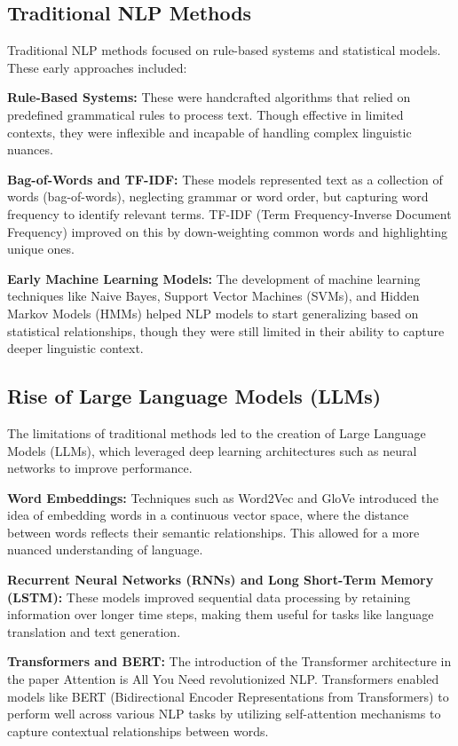 \subsection{Traditional NLP Methods}
Traditional NLP methods focused on rule-based systems and statistical models. These early approaches included:

\textbf{Rule-Based Systems:} These were handcrafted algorithms that relied on predefined grammatical rules to process text. Though effective in limited contexts, they were inflexible and incapable of handling complex linguistic nuances.

\textbf{Bag-of-Words and TF-IDF:} These models represented text as a collection of words (bag-of-words), neglecting grammar or word order, but capturing word frequency to identify relevant terms. TF-IDF (Term Frequency-Inverse Document Frequency) improved on this by down-weighting common words and highlighting unique ones.

\textbf{Early Machine Learning Models:} The development of machine learning techniques like Naive Bayes, Support Vector Machines (SVMs), and Hidden Markov Models (HMMs) helped NLP models to start generalizing based on statistical relationships, though they were still limited in their ability to capture deeper linguistic context.

\subsection{Rise of Large Language Models (LLMs)}
The limitations of traditional methods led to the creation of Large Language Models (LLMs), which leveraged deep learning architectures such as neural networks to improve performance.

\textbf{Word Embeddings:} Techniques such as Word2Vec and GloVe introduced the idea of embedding words in a continuous vector space, where the distance between words reflects their semantic relationships. This allowed for a more nuanced understanding of language.

\textbf{Recurrent Neural Networks (RNNs) and Long Short-Term Memory (LSTM):} These models improved sequential data processing by retaining information over longer time steps, making them useful for tasks like language translation and text generation.

\textbf{Transformers and BERT:} The introduction of the Transformer architecture in the paper Attention is All You Need revolutionized NLP. Transformers enabled models like BERT (Bidirectional Encoder Representations from Transformers) to perform well across various NLP tasks by utilizing self-attention mechanisms to capture contextual relationships between words.

